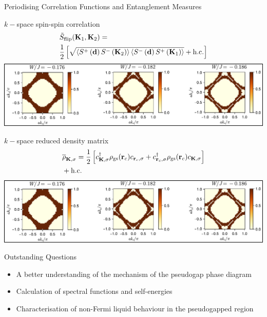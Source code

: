 \documentclass[12pt,aspectratio=169]{beamer}
\begin{document}
\begin{frame}{Periodising Correlation Functions and Entanglement Measures}
	\begin{minipage}{0.49\textwidth}
	\(k-\)space spin-spin correlation
	\begin{equation*}\begin{aligned}
	&\tilde{S}_\text{flip}({\bf K}_1, {\bf K}_2) = \\
	&\frac{1}{2}\left[\sqrt{\braket{S^+\left({\bf d}\right)S^-\left({\bf K}_2\right)}\braket{S^-\left({\bf d}\right)S^+\left({\bf K}_1\right)}} + \text{h.c.}\right]
	\end{aligned}\end{equation*}
	\includegraphics[width=\textwidth]{scattProb.pdf}
	\end{minipage}
	\begin{minipage}{0.49\textwidth}
	\(k-\)space reduced density matrix
	\begin{equation*}\begin{aligned}
		&\overline\rho_{{\bf K},\sigma} = \frac{1}{2}\left[c^\dagger_{{\bf K},\sigma} \rho_\text{gs}({\bf r}_c) c_{{\bf r}_c,\sigma} + c^\dagger_{{\bf r}_c,\sigma} \rho_\text{gs}({\bf r}_c) c_{{\bf K},\sigma}\right] \\
		& + \text{h.c.}
	\end{aligned}\end{equation*}
	\includegraphics[width=\textwidth]{scattProb.pdf}
	\end{minipage}
	
\end{frame}

\begin{frame}{Outstanding Questions}
	\begin{itemize}
		\item A better understanding of the mechanism of the pseudogap phase diagram\\[10pt]
		\item Calculation of spectral functions and self-energies\\[10pt]
		\item Characterisation of non-Fermi liquid behaviour in the pseudogapped region
	\end{itemize}
\end{frame}
\end{document}
